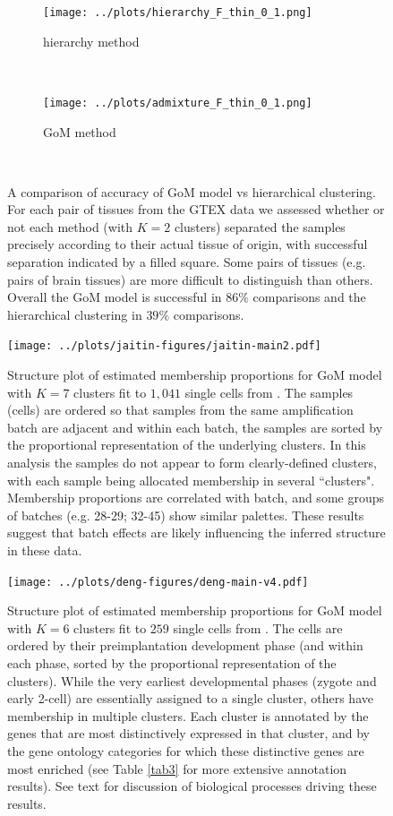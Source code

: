 \documentclass[10pt,letterpaper]{article}
\begin{document}
  \begin{figure}[!h]
    \centering
    \begin{subfigure}[t]{0.5\textwidth}
        \centering
        \texttt{[image: ../plots/hierarchy\_F\_thin\_0\_1.png]}
        \caption{hierarchy method}
    \end{subfigure}%
    ~
    \begin{subfigure}[t]{0.5\textwidth}
        \centering
        \texttt{[image: ../plots/admixture\_F\_thin\_0\_1.png]}
        \caption{GoM method}
    \end{subfigure} \\
\caption{A comparison of accuracy of GoM model vs hierarchical clustering. For each pair of tissues from the GTEX data we assessed whether or not each method (with $K=2$ clusters) separated the samples precisely according to their actual tissue of origin, with successful separation indicated by a filled square. Some pairs of tissues (e.g. pairs of brain tissues) are more difficult to distinguish than others. Overall the GoM model is successful in $86 \%$ comparisons and the hierarchical clustering in $39 \%$ comparisons.}
\label{fig2}
\end{figure}

\begin{figure}[h!]
\centering
\texttt{[image: ../plots/jaitin-figures/jaitin-main2.pdf]}
\caption{Structure plot of estimated membership proportions for GoM model with $K=7$ clusters fit to $1,041$ single cells from \cite{Jaitin2014}. The samples (cells) are ordered so that samples from the same amplification batch are adjacent and within each batch, the samples are sorted by the proportional representation of the underlying clusters. In this analysis the samples do not appear to form clearly-defined clusters, with each sample being allocated membership in several ``clusters". Membership proportions are correlated with batch, and some groups of batches (e.g. 28-29; 32-45) show similar palettes.  These results suggest that batch effects are likely influencing the inferred structure in these data.}
\label{fig3}
\end{figure}

\begin{figure}[h!]
\centering
\texttt{[image: ../plots/deng-figures/deng-main-v4.pdf]}
\caption{Structure plot of estimated membership proportions for GoM model with $K=6$ clusters fit to $259$ single cells from  \cite{Deng2014}. The cells are ordered
by their preimplantation development phase (and within each phase, sorted by the proportional representation of the clusters). While the very earliest developmental phases
(zygote and early 2-cell) are essentially assigned to a single cluster, others have membership in multiple clusters. Each cluster is annotated by
the genes that are most distinctively expressed in that cluster, and by the gene ontology categories for which these distinctive genes are most enriched (see Table \ref{tab3} for more extensive annotation results). See text for discussion of biological processes driving these results.}
\label{fig4}
\end{figure}
\end{document}
